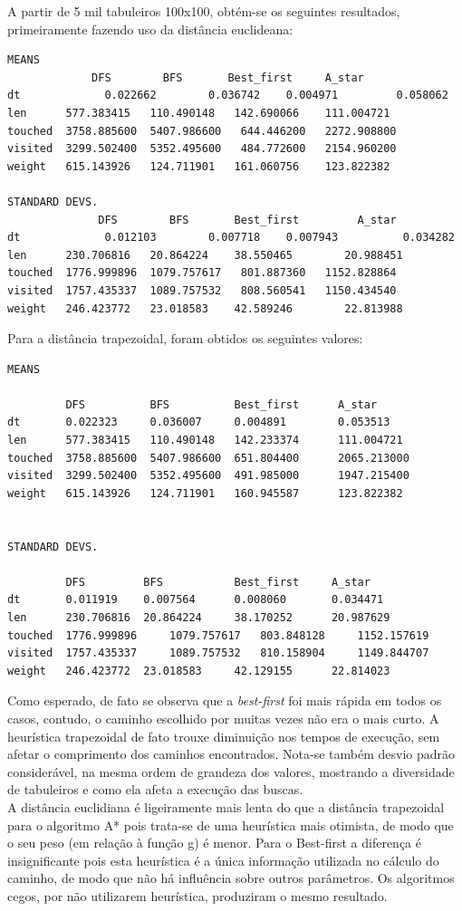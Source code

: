 \documentclass[12pt]{article}
\begin{document}
A partir de 5 mil tabuleiros 100x100, obtém-se os seguintes resultados, primeiramente fazendo uso da distância euclideana:\\

\begin{verbatim}
MEANS
             DFS      	BFS       Best_first   	 A_star
dt      	   0.022662 	   0.036742	   0.004971 	    0.058062
len   	 577.383415   110.490148   142.690066    111.004721
touched  3758.885600  5407.986600   644.446200   2272.908800
visited  3299.502400  5352.495600   484.772600   2154.960200
weight	 615.143926   124.711901   161.060756    123.822382

STANDARD DEVS.
              DFS      	 BFS       Best_first   	  A_star
dt      	   0.012103 	   0.007718	   0.007943 	     0.034282
len   	 230.706816	  20.864224    38.550465	    20.988451
touched  1776.999896  1079.757617   801.887360   1152.828864
visited  1757.435337  1089.757532   808.560541   1150.434540
weight	 246.423772	  23.018583    42.589246	    22.813988
\end{verbatim}

Para a distância trapezoidal, foram obtidos os seguintes valores:

\begin{verbatim}
MEANS

         DFS          BFS          Best_first      A_star
dt       0.022323     0.036007	   0.004891 	   0.053513
len   	 577.383415   110.490148   142.233374      111.004721
touched  3758.885600  5407.986600  651.804400      2065.213000
visited  3299.502400  5352.495600  491.985000      1947.215400
weight	 615.143926   124.711901   160.945587      123.822382


STANDARD DEVS.

         DFS      	 BFS           Best_first     A_star
dt       0.011919 	 0.007564      0.008060       0.034471
len   	 230.706816	 20.864224     38.170252      20.987629
touched  1776.999896     1079.757617   803.848128     1152.157619
visited  1757.435337     1089.757532   810.158904     1149.844707
weight	 246.423772	 23.018583     42.129155      22.814023

\end{verbatim}

Como esperado, de fato se observa que a \emph{best-first} foi mais rápida em todos os casos, contudo, o caminho escolhido por muitas vezes não era o mais curto. A heurística trapezoidal de fato trouxe diminuição nos tempos de execução, sem afetar o comprimento dos caminhos encontrados. Nota-se também desvio padrão considerável, na mesma ordem de grandeza dos valores, mostrando a diversidade de tabuleiros e como ela afeta a execução das buscas.\\

A distância euclidiana é ligeiramente mais lenta do que a distância trapezoidal para o algoritmo A* pois trata-se de uma heurística mais otimista, de modo que o seu peso (em relação à função g) é menor. Para o Best-first a diferença é insignificante pois esta heurística é a única informação utilizada no cálculo do caminho, de modo que não há influência sobre outros parâmetros. Os algoritmos cegos, por não utilizarem heurística, produziram o mesmo resultado.
\end{document}
